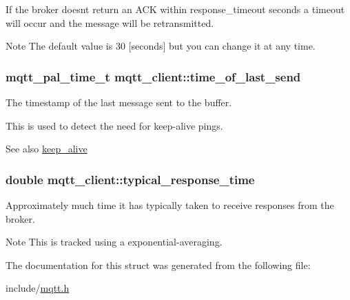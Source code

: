 If the broker doesn\textquotesingle{}t return an A\+CK within response\+\_\+timeout seconds a timeout will occur and the message will be retransmitted.

\begin{DoxyNote}{Note}
The default value is 30 \mbox{[}seconds\mbox{]} but you can change it at any time. 
\end{DoxyNote}
\subsubsection[{\texorpdfstring{time\+\_\+of\+\_\+last\+\_\+send}{time_of_last_send}}]{\setlength{\rightskip}{0pt plus 5cm}mqtt\+\_\+pal\+\_\+time\+\_\+t mqtt\+\_\+client\+::time\+\_\+of\+\_\+last\+\_\+send}\hypertarget{structmqtt__client_a9e1ad5b2573d6e693a21031a89b1717e}{}\label{structmqtt__client_a9e1ad5b2573d6e693a21031a89b1717e}


The timestamp of the last message sent to the buffer. 

This is used to detect the need for keep-\/alive pings.

\begin{DoxySeeAlso}{See also}
\hyperlink{structmqtt__client_aff533344a060e58277698039f547147a}{keep\+\_\+alive} 
\end{DoxySeeAlso}
\subsubsection[{\texorpdfstring{typical\+\_\+response\+\_\+time}{typical_response_time}}]{\setlength{\rightskip}{0pt plus 5cm}double mqtt\+\_\+client\+::typical\+\_\+response\+\_\+time}\hypertarget{structmqtt__client_a4d1f8c7f4c364b07f75efcaf9613150e}{}\label{structmqtt__client_a4d1f8c7f4c364b07f75efcaf9613150e}


Approximately much time it has typically taken to receive responses from the broker. 

\begin{DoxyNote}{Note}
This is tracked using a exponential-\/averaging. 
\end{DoxyNote}


The documentation for this struct was generated from the following file\+:\begin{DoxyCompactItemize}
\item 
include/\hyperlink{mqtt_8h}{mqtt.\+h}\end{DoxyCompactItemize}
